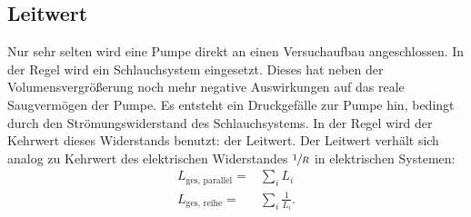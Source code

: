 \subsection{Leitwert}
Nur sehr selten wird eine Pumpe direkt an einen Versuchaufbau angeschlossen. In der Regel wird ein Schlauchsystem eingesetzt. Dieses hat neben der Volumensvergrößerung
noch mehr negative Auswirkungen auf das reale Saugvermögen der Pumpe. Es entsteht ein Druckgefälle zur Pumpe hin, bedingt durch den Strömungswiderstand des
Schlauchsystems. In der Regel wird der Kehrwert dieses Widerstands benutzt: der Leitwert. Der Leitwert verhält sich analog zu Kehrwert des elektrischen
Widerstandes $\sfrac{1}{R}$ in elektrischen Systemen:
\begin{align}
	L_\text{ges, parallel}=&\sum_i L_i \\
	L_\text{ges, reihe}=&\sum_i \frac{1}{L_i}.
\end{align}
